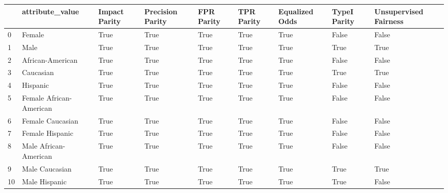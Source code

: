 \begin{tabular}{lllllllll}
\toprule
{} &          attribute\_value &  Impact Parity &  Precision Parity &  FPR Parity &  TPR Parity &  Equalized Odds &  TypeI Parity &  Unsupervised Fairness \\
\midrule
0  &                   Female &           True &              True &        True &        True &            True &         False &                  False \\
1  &                     Male &           True &              True &        True &        True &            True &          True &                   True \\
2  &         African-American &           True &              True &        True &        True &            True &         False &                  False \\
3  &                Caucasian &           True &              True &        True &        True &            True &          True &                   True \\
4  &                 Hispanic &           True &              True &        True &        True &            True &         False &                  False \\
5  &  Female African-American &           True &              True &        True &        True &            True &         False &                  False \\
6  &         Female Caucasian &           True &              True &        True &        True &            True &         False &                  False \\
7  &          Female Hispanic &           True &              True &        True &        True &            True &         False &                  False \\
8  &    Male African-American &           True &              True &        True &        True &            True &         False &                  False \\
9  &           Male Caucasian &           True &              True &        True &        True &            True &          True &                   True \\
10 &            Male Hispanic &           True &              True &        True &        True &            True &          True &                  False \\
\bottomrule
\end{tabular}
